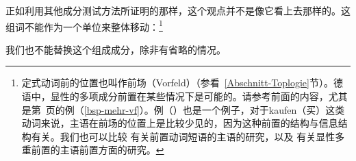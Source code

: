 正如利用其他成分测试方法所证明的那样，这个观点并不是像它看上去那样的。这组词不能作为一个单位来整体移动：\footnote{
定式动词前的位置也叫作前场（Vorfeld）（参看~\ref{Abschnitt-Toplogie}节）。德语中，显性的多项成分前置在某些情况下是可能的。请参考前面的内容，尤其是第~\pageref{bsp-mehr-vf}页的例（\ref{bsp-mehr-vf}）。例（）也是一个例子，对于kaufen（买）这类动词来说，主语在前场的位置上是比较少见的，因为这种前置的结构与信息结构有关。我们也可以比较\citealp{dKM2003a} 有关前置动词短语的主语的研究，以及\citealp[]{BC2010a} 有关显性多重前置的主语前置方面的研究。
}
\z

\noindent
我们也不能替换这个组成成分，除非有省略的情况。

